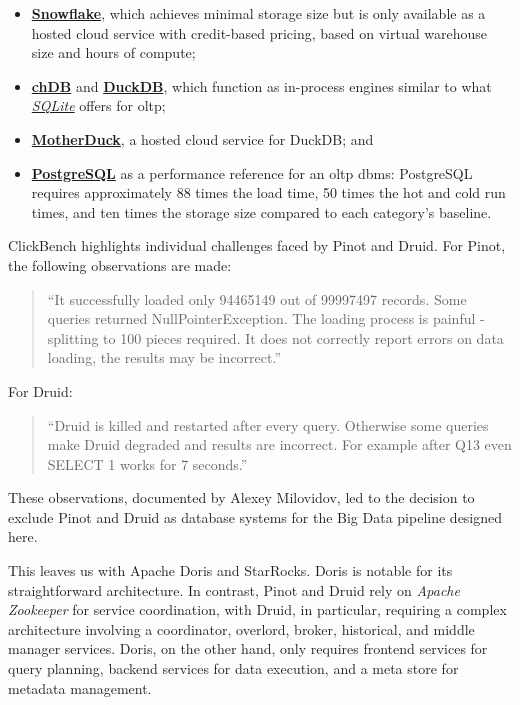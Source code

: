 \begin{itemize}
    \item \href{https://snowflake.com/}{\textbf{Snowflake}}, which achieves minimal storage size but is only available as a hosted cloud service with credit-based pricing, based on virtual warehouse size and hours of compute;
    \item \href{https://clickhouse.com/chdb}{\textbf{chDB}} and \href{https://duckdb.org/}{\textbf{DuckDB}}, which function as in-process engines similar to what \href{https://www.sqlite.org/}{\textit{SQLite}} offers for \ac{oltp};
    \item \href{https://motherduck.com/}{\textbf{MotherDuck}}, a hosted cloud service for DuckDB; and
    \item \href{https://postgresql.org/}{\textbf{PostgreSQL}} as a performance reference for an \ac{oltp} \ac{dbms}: PostgreSQL requires approximately 88 times the load time, 50 times the hot and cold run times, and ten times the storage size compared to each category's baseline.
\end{itemize}

ClickBench highlights individual challenges faced by Pinot and Druid.
For Pinot, the following observations are made:

\begin{quote}
    ``It successfully loaded only 94465149 out of 99997497 records.
    Some queries returned NullPointerException.
    The loading process is painful - splitting to 100 pieces required.
    It does not correctly report errors on data loading, the results may be incorrect.''~\cite{Milovidov2022}
\end{quote}

For Druid:

\begin{quote}
    ``Druid is killed and restarted after every query.
    Otherwise some queries make Druid degraded and results are incorrect.
    For example after Q13 even SELECT 1 works for 7 seconds.''~\cite{Milovidov2022}
\end{quote}

These observations, documented by Alexey Milovidov, led to the decision to exclude Pinot and Druid as database systems for the Big Data pipeline designed here.

This leaves us with Apache Doris and StarRocks.
Doris is notable for its straightforward architecture.
In contrast, Pinot and Druid rely on \textit{Apache Zookeeper} for service coordination, with Druid, in particular, requiring a complex architecture involving a coordinator, overlord, broker, historical, and middle manager services.
Doris, on the other hand, only requires frontend services for query planning, backend services for data execution, and a meta store for metadata management.

